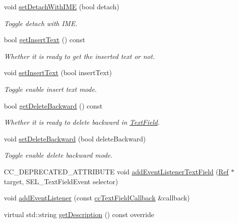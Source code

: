 \begin{DoxyCompactItemize}
void \hyperlink{classui_1_1TextField_accfce2b8fdc0f2ae95e3f07dabd9f292}{set\+Detach\+With\+I\+ME} (bool detach)
\begin{DoxyCompactList}\small\item\em Toggle detach with I\+ME. \end{DoxyCompactList}\item 
bool \hyperlink{classui_1_1TextField_a627e0f88f89ac842204f48b5fc530518}{get\+Insert\+Text} () const
\begin{DoxyCompactList}\small\item\em Whether it is ready to get the inserted text or not. \end{DoxyCompactList}\item 
void \hyperlink{classui_1_1TextField_a87a947d81dffe504e2a1abd0712d7efc}{set\+Insert\+Text} (bool insert\+Text)
\begin{DoxyCompactList}\small\item\em Toggle enable insert text mode. \end{DoxyCompactList}\item 
bool \hyperlink{classui_1_1TextField_ace67fc7cdbc68d981ab918e86d0d462c}{get\+Delete\+Backward} () const
\begin{DoxyCompactList}\small\item\em Whether it is ready to delete backward in \hyperlink{classui_1_1TextField}{Text\+Field}. \end{DoxyCompactList}\item 
void \hyperlink{classui_1_1TextField_af82f6143c7a6554e654a73527bf7e83e}{set\+Delete\+Backward} (bool delete\+Backward)
\begin{DoxyCompactList}\small\item\em Toggle enable delete backward mode. \end{DoxyCompactList}\item 
C\+C\+\_\+\+D\+E\+P\+R\+E\+C\+A\+T\+E\+D\+\_\+\+A\+T\+T\+R\+I\+B\+U\+TE void \hyperlink{classui_1_1TextField_af2e6a186536b2e90b37780255f181a95}{add\+Event\+Listener\+Text\+Field} (\hyperlink{classRef}{Ref} $\ast$target, S\+E\+L\+\_\+\+Text\+Field\+Event selector)
\item 
void \hyperlink{classui_1_1TextField_a2fb48806ef4efd12c4d7db8f58956509}{add\+Event\+Listener} (const \hyperlink{classui_1_1TextField_a8b58cb15659d59187cfa0586d1420f1f}{cc\+Text\+Field\+Callback} \&callback)
\item 
virtual std\+::string \hyperlink{classui_1_1TextField_a4bad40260133981d610490c948bc0648}{get\+Description} () const override

\end{DoxyCompactItemize}
